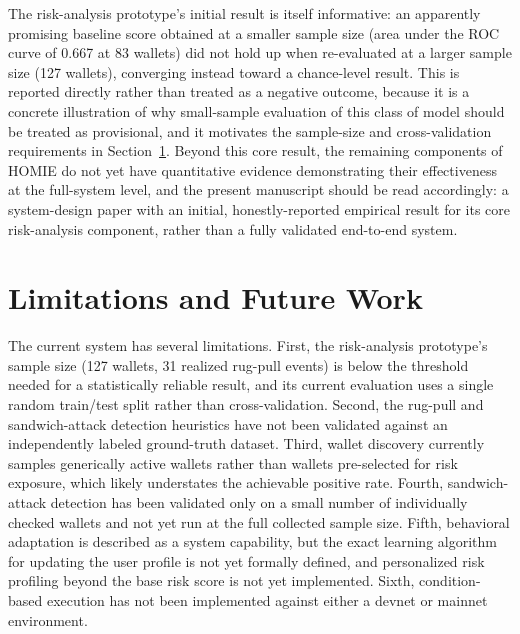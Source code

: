\documentclass[conference]{IEEEtran}
\begin{document}
The risk-analysis prototype's initial result is itself informative: an apparently promising baseline score obtained at a smaller sample size (area under the ROC curve of 0.667 at 83 wallets) did not hold up when re-evaluated at a larger sample size (127 wallets), converging instead toward a chance-level result. This is reported directly rather than treated as a negative outcome, because it is a concrete illustration of why small-sample evaluation of this class of model should be treated as provisional, and it motivates the sample-size and cross-validation requirements in Section~\ref{sec:limitations}. Beyond this core result, the remaining components of HOMIE do not yet have quantitative evidence demonstrating their effectiveness at the full-system level, and the present manuscript should be read accordingly: a system-design paper with an initial, honestly-reported empirical result for its core risk-analysis component, rather than a fully validated end-to-end system.

\section{Limitations and Future Work}
\label{sec:limitations}

The current system has several limitations. First, the risk-analysis prototype's sample size (127 wallets, 31 realized rug-pull events) is below the threshold needed for a statistically reliable result, and its current evaluation uses a single random train/test split rather than cross-validation. Second, the rug-pull and sandwich-attack detection heuristics have not been validated against an independently labeled ground-truth dataset. Third, wallet discovery currently samples generically active wallets rather than wallets pre-selected for risk exposure, which likely understates the achievable positive rate. Fourth, sandwich-attack detection has been validated only on a small number of individually checked wallets and not yet run at the full collected sample size. Fifth, behavioral adaptation is described as a system capability, but the exact learning algorithm for updating the user profile is not yet formally defined, and personalized risk profiling beyond the base risk score is not yet implemented. Sixth, condition-based execution has not been implemented against either a devnet or mainnet environment.
\end{document}
